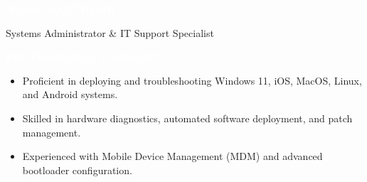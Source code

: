 \documentclass[9pt]{src/developercv}
\begin{document}
  \pagecolor{white}
  \colorbox{sky900}{\hspace{0.3cm}\HUGE\textcolor{white}{\textbf{\MakeUppercase{Nasif}}}\hspace{0.3cm}}
  \colorbox{sky800}{\hspace{0.3cm}\HUGE\textcolor{white}{\textbf{\MakeUppercase{Mauthoor}}}\hspace{0.3cm}}
  
  \vspace{0.1cm}
  \hspace{0.1cm}
  \vcenteredhbox{\textcolor{black}{Oakville, Ontario}}
  \hfill
  \hspace{0.1cm}
  \vcenteredhbox{\textcolor{black}{416-655-2083}}
  \hfill
  \hspace{0.1cm}
  \hfill
  \hspace{0.1cm}
  
  \vspace{0.5cm}
  {\huge Systems Administrator \& IT Support Specialist}

  \vspace{\baselineskip}
  \colorbox{sky950}{\textcolor{white}{\LARGE\MakeUppercase{\textbf{Professional Summary}}}}
  \begin{itemize}[leftmargin=2em, itemsep=0.1em]
    \item Proficient in deploying and troubleshooting Windows 11, iOS, MacOS,
    Linux, and Android systems.
    \item Skilled in hardware diagnostics, automated software deployment, and
    patch management.
    \item Experienced with Mobile Device Management (MDM) and advanced
    bootloader configuration.
  \end{itemize}
\end{document}
